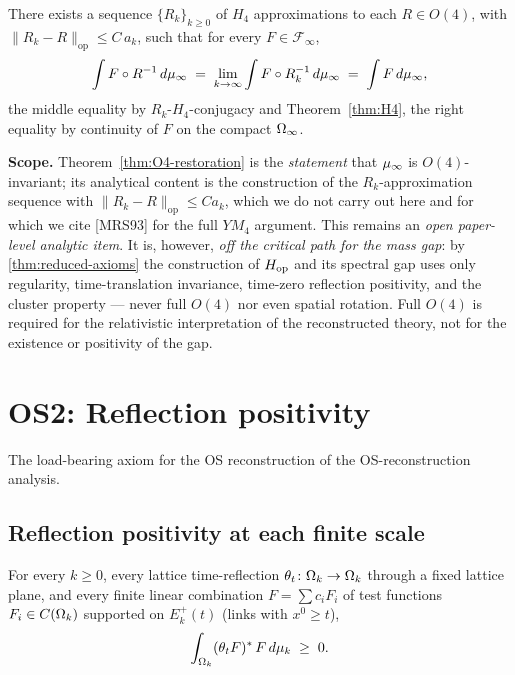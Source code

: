 \begin{theorem}
\label{thm:O4-restoration}
There exists a sequence $\{R_k\}_{k \ge 0}$ of $H_4$ approximations
to each $R \in O(4)$, with
$\|R_k - R\|_{\mathrm{op}} \le C \, a_k$, such that for every
$F \in \mathcal{F}_\infty$,
\begin{equation*}
  \int F \circ R^{-1} \, d\mu_\infty
  \;=\;
  \lim_{k \to \infty} \int F \circ R_k^{-1} \, d\mu_\infty
  \;=\;
  \int F \, d\mu_\infty,
\end{equation*}
the middle equality by $R_k$-$H_4$-conjugacy and
Theorem~\ref{thm:H4}, the right equality by continuity of $F$ on the
compact $\Omega_\infty$.
\end{theorem}

\textbf{Scope.}  Theorem~\ref{thm:O4-restoration} is the
\emph{statement} that $\mu_\infty$ is $O(4)$-invariant; its analytical
content is the construction of the $R_k$-approximation sequence with
$\|R_k - R\|_{\mathrm{op}} \le C a_k$, which we do not carry out here
and for which we cite [MRS93] for the full $YM_4$ argument.  This
remains an \emph{open paper-level analytic item}.  It is, however,
\emph{off the critical path for the mass gap}: by
\cref{thm:reduced-axioms} the construction of $H_{\mathrm{op}}$ and its spectral
gap uses only regularity, time-translation invariance, time-zero
reflection positivity, and the cluster property --- never full
$O(4)$ nor even spatial rotation.  Full $O(4)$ is required for the
relativistic interpretation of the reconstructed theory, not for the
existence or positivity of the gap.

\section{OS2: Reflection positivity}
\label{sec:os2}

The load-bearing axiom for the OS reconstruction of the OS-reconstruction analysis.

\subsection{Reflection positivity at each finite scale}

\begin{theorem}
\label{thm:OSP-finite-k}
For every $k \ge 0$, every lattice time-reflection
$\theta_t \colon \Omega_k \to \Omega_k$ through a fixed lattice plane, and
every finite linear combination $F = \sum c_i F_i$ of test functions
$F_i \in C(\Omega_k)$ supported on $E_k^+(t)$ (links with $x^0 \ge t$),
\begin{equation*}
  \int_{\Omega_k} (\theta_t F)^* \, F \, d\mu_k \;\ge\; 0.
\end{equation*}
\end{theorem}

